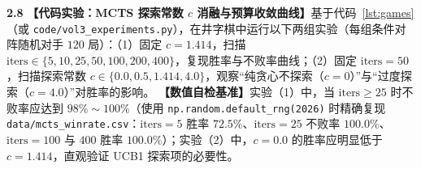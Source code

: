\textbf{2.8} \quad \textbf{【代码实验：MCTS 探索常数 $c$ 消融与预算收敛曲线】}基于代码~\ref{lst:games}（或 \texttt{code/\allowbreak vol3\_experiments.py}），在井字棋中运行以下两组实验（每组条件对阵随机对手 $120$ 局）：（1）固定 $c=1.414$，扫描 $\text{iters} \in \{5,\allowbreak 10,\allowbreak 25,\allowbreak 50,\allowbreak 100,\allowbreak 200,\allowbreak 400\}$，复现胜率与不败率曲线；（2）固定 $\text{iters} = 50$，扫描探索常数 $c \in \{0.0, 0.5, 1.414, 4.0\}$，观察“纯贪心不探索（$c=0$）”与“过度探索（$c=4.0$）”对胜率的影响。
\textbf{【数值自检基准】}实验（1）中，当 $\text{iters} \ge 25$ 时不败率应达到 $98\%\sim 100\%$（使用 \texttt{np.random.default\_rng(2026)} 时精确复现 \texttt{data/mcts\_winrate.csv}：$\text{iters}=5$ 胜率 $72.5\%$、$\text{iters}=25$ 不败率 $100.0\%$、$\text{iters}=100$ 与 $400$ 胜率 $100.0\%$）；实验（2）中，$c=0.0$ 的胜率应明显低于 $c=1.414$，直观验证 UCB1 探索项的必要性。
